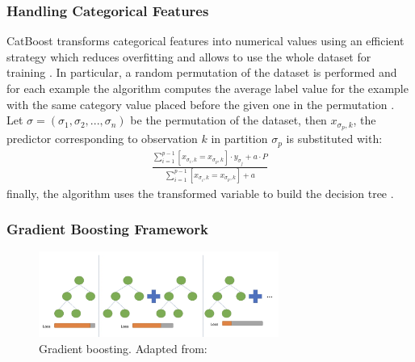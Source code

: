 \subsubsection{Handling Categorical Features}

CatBoost transforms categorical features into numerical values using an efficient strategy which reduces overfitting and allows to use the whole dataset for training \cite{dorogush2018catboost}. 
In particular, a random permutation of the dataset is performed and for each example the algorithm computes the average label value for the example with the same category value placed before the given one in the permutation \cite{dorogush2018catboost}. Let $\sigma = (\sigma_1, \sigma_2, ..., \sigma_n)$ be the permutation of the dataset, then $x_{\sigma_p, k}$, the predictor corresponding to observation $k$ in partition $\sigma_p$ is substituted with:
\begin{align}
    \frac{\sum_{i=1}^{p-1} [x_{\sigma_i, k} = x_{\sigma_p, k}] \cdot y_{\sigma_j} + a \cdot P }{\sum_{i=1}^{p-1} [x_{\sigma_i, k} = x_{\sigma_p, k}] + a}
\end{align}
\noindent finally, the algorithm uses the transformed variable to build the decision tree \cite{dorogush2018catboost}.

\subsubsection{Gradient Boosting Framework}

\begin{figure}[H]
    \centering
    \includegraphics[width=0.7\textwidth]{figures/gradient_boosting_v2.png}
    \caption{Gradient boosting. Adapted from: \cite{Yenigun2022}}
    \label{fig:catboost}
\end{figure}

